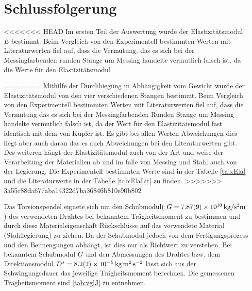 
\section{Schlussfolgerung}
<<<<<<< HEAD
Im ersten Teil der Auswertung wurde der Elastizitätsmodul $E$ bestimmt. Beim Vergleich von den Experimentell bestimmten Werten mit Literaturwerten fiel auf, dass die Vermutung, das es sich bei der Messingfarbenden runden Stange um Messing handelte vermutlich falsch ist, da die Werte für den Elastizitätsmodul 























=======
Mithilfe der Durchbiegung in Abhängigkeit vom Gewicht wurde der Elastizitätsmodul von den vier verschiedenen Stangen bestimmt.
Beim Vergleich von den Experimentell bestimmten Werten mit Literaturwerten fiel auf, dass die Vermutung das es sich bei der Messingfarbenden Runden Stange um Messing handelte vermutlich falsch ist, da der Wert für den Elastizitätsmodul fast identisch mit dem von Kupfer ist. 
Es gibt bei allen Werten Abweichungen dies liegt aber auch daran das es auch Abweichungen bei den Literaturwerten gibt. Des weiteren hängt der Elastizitätsmodul auch von der Art und weise der Verarbeitung der Materialien ab und im falle von Messing und Stahl auch von der Legierung.
Die Experimentell bestimmten Werte sind in der Tabelle \ref{tab:Ela} und die Literaturwerte in der Tabelle \ref{tab:ElaLit} zu finden.
>>>>>>> 3a55c88da677aba14322d7ba36846b810e90b802

Das Torsionspendel eignete sich um den Schubmodul( $G =\SI{7.87+-0.09e10}{kg \per \second \squared  \metre}$) des verwendeten Drahtes bei bekanntem Trägheitsmoment zu bestimmen und durch diese Materialeigenschaft Rückschlüsse auf das verwendete Material (Stahllegierung) zu ziehen. Da der Schubmodul jedoch von dem Fertigungsprozess und den Beimengungen abhängt, ist dies nur als Richtwert zu verstehen. Bei bekanntem Schubmodul $G$ und den Abmessungen des Drahtes bzw. dem Direktionsmodul $D^*=\SI{8.2+-0.2e-5}{\kilogram \metre \squared \per \second \squared }$  lässt sich aus der Schwingungsdauer das jeweilige Trägheitsmoment berechnen.  Die gemessenen  Trägheitsmoment  sind \cref{tab:vglJ} zu entnehmen.








